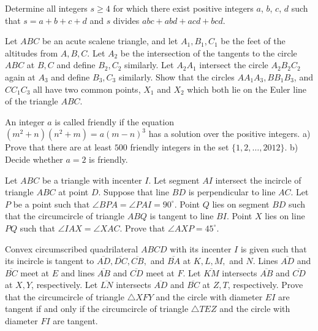 \documentclass[11pt]{scrartcl}
\begin{document}
\begin{problem}[211625179383762]
Determine all integers $s \ge 4$ for which there exist positive integers $a$, $b$, $c$, $d$ such that $s = a+b+c+d$ and $s$ divides $abc+abd+acd+bcd$.
\end{problem}
\begin{problem}[8330669807899443473]
Let $ABC$ be an acute scalene triangle, and let $A_1, B_1, C_1$ be the feet of the altitudes from $A, B, C$. Let $A_2$ be the intersection of the tangents to the circle $ABC$ at $B, C$ and define $B_2, C_2$ similarly. Let $A_2A_1$ intersect the circle $A_2B_2C_2$ again at $A_3$ and define $B_3, C_3$ similarly. Show that the circles $AA_1A_3, BB_1B_3$, and $CC_1C_3$ all have two common points, $X_1$ and $X_2$ which both lie on the Euler line of the triangle $ABC$.
\end{problem}
\begin{problem}[9184583066675086219]
An integer $a$ is called friendly if the equation $(m^2+n)(n^2+m)=a(m-n)^3$ has a solution over the positive integers.
a) Prove that there are at least $500$ friendly integers in the set $\{ 1,2,\ldots ,2012\}$.
b) Decide whether $a=2$ is friendly.
\end{problem}
\begin{problem}[548248988934632]
Let $ABC$ be a triangle with incenter $I$. Let segment $AI$ intersect the incircle of triangle $ABC$ at point $D$. Suppose that line $BD$ is perpendicular to line $AC$. Let $P$ be a point such that $\angle BPA = \angle PAI = 90^\circ$. Point $Q$ lies on segment $BD$ such that the circumcircle of triangle $ABQ$ is tangent to line $BI$. Point $X$ lies on line $PQ$ such that $\angle IAX = \angle XAC$. Prove that $\angle AXP = 45^\circ$.
\end{problem}
\begin{problem}[5182115879210719670]
	Convex circumscribed quadrilateral $ABCD$ with its incenter $I$ is given such that its incircle is tangent to $\overline{AD},\overline{DC},\overline{CB},$ and $\overline{BA}$ at $K,L,M,$ and $N$. Lines $\overline{AD}$ and $\overline{BC}$ meet at $E$ and lines $\overline{AB}$ and $\overline{CD}$ meet at $F$. Let $\overline{KM}$ intersects $\overline{AB}$ and $\overline{CD}$ at $X,Y$, respectively. Let $\overline{LN}$ intersects $\overline{AD}$ and $\overline{BC}$ at $Z,T$, respectively. Prove that the circumcircle of triangle $\triangle XFY$ and the circle with diameter $EI$ are tangent if and only if the circumcircle of triangle $\triangle TEZ$ and the circle with diameter $FI$ are tangent.
\end{problem}
\end{document}
